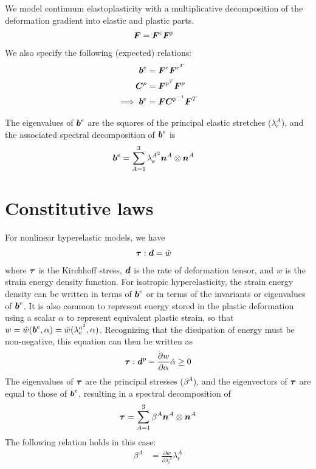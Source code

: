 \documentclass[10pt]{article}
\begin{document}
We model continuum elastoplasticity with a multiplicative decomposition of the deformation gradient into elastic and plastic parts.
\begin{align}
\mbox{\boldmath$ F$} &= \mbox{\boldmath$ F$}^e \mbox{\boldmath$ F$}^p
\end{align}
We also specify the following (expected) relations:
\begin{align}
\mbox{\boldmath$ b$}^e &= \mbox{\boldmath$ F$}^e \mbox{\boldmath$ F$}^{e^T}\\
\mbox{\boldmath$ C$}^p &= \mbox{\boldmath$ F$}^{p^T} \mbox{\boldmath$ F$}^p\\
\implies \mbox{\boldmath$ b$}^e &= \mbox{\boldmath$ F$}\mbox{\boldmath$ C$}^{p^{-1}}\mbox{\boldmath$ F$}^T
\end{align}

The eigenvalues of $\mbox{\boldmath$ b$}^e$ are the squares of the principal elastic stretches ($\lambda^A_e$), and the associated spectral decomposition of $\mbox{\boldmath$ b$}^e$ is
\begin{align}
\mbox{\boldmath$ b$}^e &= \sum_{A=1}^3 \lambda_e^{A^2} \mbox{\boldmath$ n$}^A \otimes \mbox{\boldmath$ n$}^A
\end{align}

\section{Constitutive laws}

For nonlinear hyperelastic models, we have
\begin{align}
\mbox{\boldmath$\tau$}:\mbox{\boldmath$ d$} &= \dot{w}
\end{align}
where $\mbox{\boldmath$\tau$}$ is the Kirchhoff stress, $\mbox{\boldmath$ d$}$ is the rate of deformation tensor, and $w$ is the strain energy density function. For isotropic hyperelasticity, the strain energy density can be written in terms of $\mbox{\boldmath$ b$}^e$ or in terms of the invariants or eigenvalues of $\mbox{\boldmath$ b$}^e$. It is also common to represent energy stored in the plastic deformation using a scalar $\alpha$ to represent equivalent plastic strain, so that $w = \hat{w}(\mbox{\boldmath$ b$}^e,\alpha) = \bar{w}(\lambda_e^{a^2},\alpha)$. Recognizing that the dissipation of energy must be non-negative, this equation can then be written as
\begin{align}
\mbox{\boldmath$\tau$}:\mbox{\boldmath$ d$}^p - \frac{\partial w}{\partial \alpha} \dot{\alpha} \geq 0
\end{align}
The eigenvalues of $\mbox{\boldmath$\tau$}$ are the principal stresses ($\beta^A$), and the eigenvectors of $\mbox{\boldmath$\tau$}$ are equal to those of $\mbox{\boldmath$ b$}^e$, resulting in a spectral decomposition of
\begin{align}
\mbox{\boldmath$\tau$} = \sum_{A=1}^3 \beta^A \mbox{\boldmath$ n$}^A \otimes \mbox{\boldmath$ n$}^A
\end{align}
The following relation holds in this case:
\begin{align}
\beta^A &= \frac{\partial \bar{w}}{\partial \lambda_e^{A}}\lambda_e^{A}
\label{eqn:beta}
\end{align}
\end{document}

